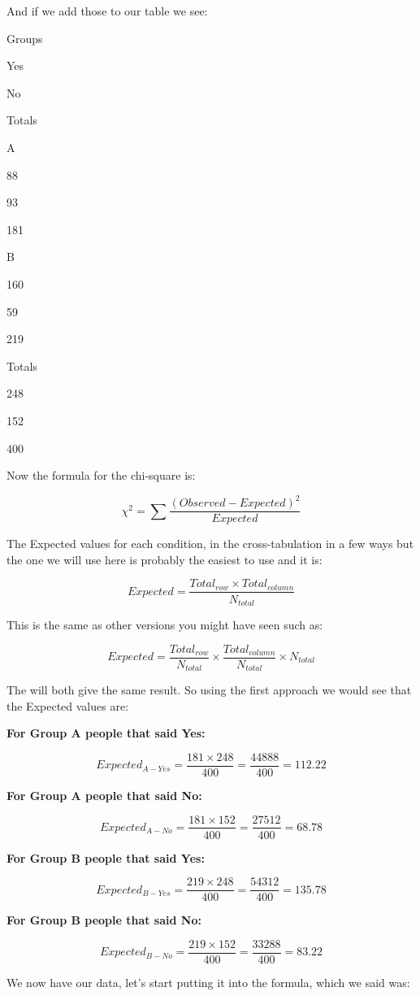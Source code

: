 \documentclass[
  oneside]{book}
\begin{document}
And if we add those to our table we see:

Groups

Yes

No

Totals

A

88

93

181

B

160

59

219

Totals

248

152

400

Now the formula for the chi-square is:

\[\chi^2 = \sum\frac{(Observed - Expected)^2}{Expected}\]

The Expected values for each condition, in the cross-tabulation in a few ways but the one we will use here is probably the easiest to use and it is:

\[Expected = \frac{Total_{row} \times Total_{column}}{N_{total}}\]

This is the same as other versions you might have seen such as:

\[Expected = \frac{Total_{row}}{N_{total}} \times \frac{Total_{column}}{N_{total}} \times N_{total}\]

The will both give the same result. So using the first approach we would see that the Expected values are:

\textbf{For Group A people that said Yes:}

\[Expected_{A-Yes} = \frac{181 \times 248}{400} = \frac{44888}{400} = 112.22\]

\textbf{For Group A people that said No:}

\[Expected_{A-No} = \frac{181 \times 152}{400} = \frac{27512}{400} = 68.78\]

\textbf{For Group B people that said Yes:}

\[Expected_{B-Yes} = \frac{219 \times 248}{400} = \frac{54312}{400} = 135.78\]

\textbf{For Group B people that said No:}

\[Expected_{B-No} = \frac{219 \times 152}{400} = \frac{33288}{400} = 83.22\]

We now have our data, let's start putting it into the formula, which we said was:
\end{document}
